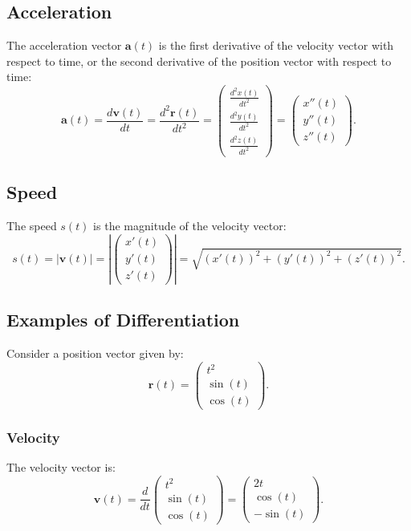 \documentclass[a4paper,12pt]{article}
\begin{document}
\begin{itemize}[leftmargin=*]
\subsection*{Acceleration}

The acceleration vector \(\mathbf{a}(t)\) is the first derivative of the velocity vector with respect to time, or the second derivative of the position vector with respect to time:
\[
\mathbf{a}(t) = \frac{d\mathbf{v}(t)}{dt} = \frac{d^2\mathbf{r}(t)}{dt^2} = \begin{pmatrix} \frac{d^2x(t)}{dt^2} \\ \frac{d^2y(t)}{dt^2} \\ \frac{d^2z(t)}{dt^2} \end{pmatrix} = \begin{pmatrix} x''(t) \\ y''(t) \\ z''(t) \end{pmatrix}.
\]

\subsection*{Speed}

The speed \(s(t)\) is the magnitude of the velocity vector:
\[
s(t) = |\mathbf{v}(t)| = \left| \begin{pmatrix} x'(t) \\ y'(t) \\ z'(t) \end{pmatrix} \right| = \sqrt{(x'(t))^2 + (y'(t))^2 + (z'(t))^2}.
\]

\subsection*{Examples of Differentiation}

Consider a position vector given by:
\[
\mathbf{r}(t) = \begin{pmatrix} t^2 \\ \sin(t) \\ \cos(t) \end{pmatrix}.
\]

\subsubsection*{Velocity}

The velocity vector is:
\[
\mathbf{v}(t) = \frac{d}{dt} \begin{pmatrix} t^2 \\ \sin(t) \\ \cos(t) \end{pmatrix} = \begin{pmatrix} 2t \\ \cos(t) \\ -\sin(t) \end{pmatrix}.
\]


\end{itemize}
\end{document}
